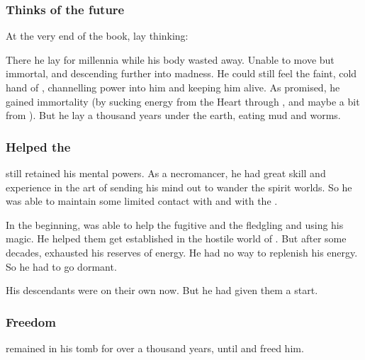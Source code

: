 \subsubsection{Thinks of the future}
At the very end of the book, \Semiza{} lay thinking: 
\begin{prose}
\end{prose}


There he lay for millennia while his body wasted away.
Unable to move but immortal, and descending further into madness. 
He could still feel the faint, cold hand of \Daggerrain{}, channelling power into him and keeping him alive. 
As \Daggerrain{} promised, he gained immortality (by sucking energy from the Heart through \Nyx, and maybe a bit from \Erebos). 
But he lay a thousand years under the earth, eating mud and worms. 





\subsubsection{Helped the \resphain}
\Semiza still retained his mental powers.
As a necromancer, he had great skill and experience in the art of sending his mind out to wander the spirit worlds.
So he was able to maintain some limited contact with \Daggerrain and with the \resphain.

In the beginning, \Semiza was able to help the fugitive \nephilim and the fledgling \resphain and \humans using his magic.
He helped them get established in the hostile world of \Nyx. 
But after some decades, \Semiza exhausted his reserves of energy.
He had no way to replenish his energy.
So he had to go dormant.

His descendants were on their own now.
But he had given them a start. 





\subsubsection{Freedom}
\Semiza remained in his tomb for over a thousand years, until  and freed him.























